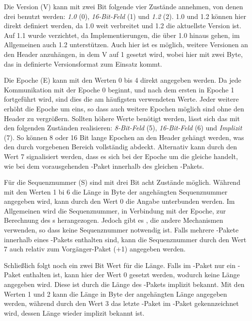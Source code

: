 Die Version (V) kann mit zwei Bit folgende vier Zustände annehmen, von denen drei benutzt werden: \textit{ 1.0} (0), \textit{16-Bit-Feld} (1) und
\textit{ 1.2} (2).  1.0 und  1.2 können hier direkt definiert werden, da  1.0 weit verbreitet
 und  1.2 die aktuellste Version ist. Auf  1.1 wurde verzichtet, da Implementierungen, die über  1.0 hinaus gehen, im Allgemeinen auch
 1.2 unterstützen. Auch hier ist es möglich, weitere Versionen an den Header anzuhängen, in dem V auf 1 gesetzt wird, wobei hier mit zwei Byte, das in 
definierte Versionsformat zum Einsatz kommt.

Die Epoche (E) kann mit den Werten 0 bis 4 direkt angegeben werden. Da jede Kommunikation mit der Epoche 0 beginnt, und
nach dem ersten  in Epoche 1 fortgeführt wird, sind dies die am häufigsten verwendeten Werte. Jeder weitere  erhöht die Epoche um eins,
so dass auch weitere Epochen möglich sind ohne den Header zu vergrößern. Sollten höhere Werte benötigt werden, lässt sich das mit den folgenden Zuständen realisieren:
\textit{8-Bit-Feld} (5), \textit{16-Bit-Feld} (6) und \textit{Implizit} (7). So können 8 oder 16 Bit lange Epochen an den Header gehängt werden, was den
durch  vorgebenen Bereich vollständig abdeckt. Alternativ kann durch den Wert 7 signalisiert werden, dass es sich bei der Epoche um die gleiche
handelt, wie bei dem vorausgehenden -Paket innerhalb des gleichen -Pakets.

Für die Sequenznummer (S) sind mit drei Bit acht Zustände möglich. Während mit den Werten 1 bi 6 die Länge in Byte der angehängten Sequenznummer angegeben wird,
kann durch den Wert 0 die Angabe unterbunden werden. Im Allgemeinen wird die Sequenznummer, in Verbindung mit der Epoche, zur Berechnung des s herangezogen.
Jedoch gibt es , die andere Mechanismen verwenden, so dass keine Sequenznummer notwendig ist. Falls mehrere -Pakete innerhalb eines
-Pakets enthalten sind, kann die Sequenznummer durch den Wert 7 auch relativ zum Vorgänger-Paket (+1) angegeben werden.

Schließlich folgt noch ein zwei Bit Wert für die Länge. Falls im -Paket nur ein -Paket enthalten ist, kann hier der Wert 0 gesetzt werden, wodurch
keine Länge angegeben wird. Diese ist durch die Länge des -Pakets implizit bekannt. Mit den Werten 1 und 2 kann die Länge in Byte der angehängten Länge
angegeben werden, während durch den Wert 3 das letzte -Paket im -Paket gekennzeichnet wird, dessen Länge wieder implizit bekannt ist.